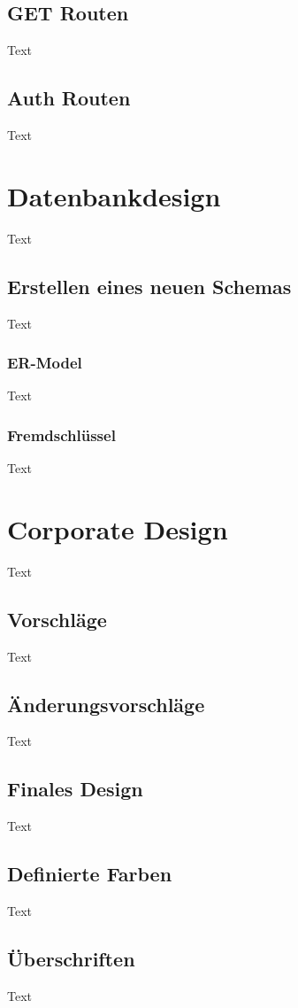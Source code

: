 \subsection{GET Routen}
Text

\subsection{Auth Routen}
Text


\section{Datenbankdesign}
Text

\subsection{Erstellen eines neuen Schemas}
Text

\subsubsection{ER-Model}
Text

\subsubsection{Fremdschlüssel}
Text


\section{Corporate Design}
Text

\subsection{Vorschläge}
Text

\subsection{Änderungsvorschläge}
Text

\subsection{Finales Design}
Text

\subsection{Definierte Farben}
Text

\subsection{Überschriften}
Text

